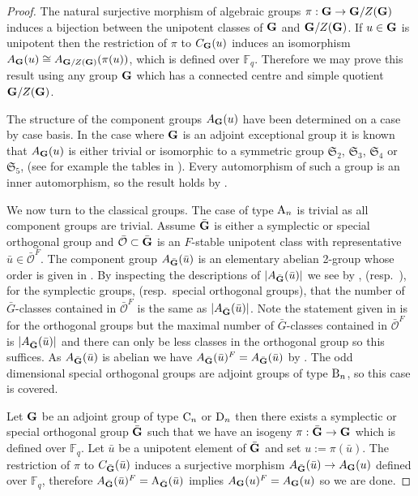 \documentclass{jt-calcs}
\renewcommand{\cref}{\Cref}
\begin{document}
\begin{proof}
The natural surjective morphism of algebraic groups $\pi : \mathbf{G} \to \mathbf{G}/Z(\mathbf{G})$ induces a bijection between the unipotent classes of $\mathbf{G}$ and $\mathbf{G}/Z(\mathbf{G})$. If $u \in \mathbf{G}$ is unipotent then the restriction of $\pi$ to $C_{\mathbf{G}}(u)$ induces an isomorphism $A_{\mathbf{G}}(u) \cong A_{\mathbf{G}/Z(\mathbf{G})}(\pi(u))$, which is defined over $\mathbb{F}_q$. Therefore we may prove this result using any group $\mathbf{G}$ which has a connected centre and simple quotient $\mathbf{G}/Z(\mathbf{G})$.

The structure of the component groups $A_{\mathbf{G}}(u)$ have been determined on a case by case basis. In the case where $\mathbf{G}$ is an adjoint exceptional group it is known that $A_{\mathbf{G}}(u)$ is either trivial or isomorphic to a symmetric group $\mathfrak{S}_2$, $\mathfrak{S}_3$, $\mathfrak{S}_4$ or $\mathfrak{S}_5$, (see for example the tables in \cite[\S 13.1]{carter:1993:finite-groups-of-lie-type}). Every automorphism of such a group is an inner automorphism, so the result holds by \cref{lem:inner-auto-comp-grp}.

We now turn to the classical groups. The case of type $\operatorname{A}_n$ is trivial as all component groups are trivial. Assume $\bar{\mathbf{G}}$ is either a symplectic or special orthogonal group and $\bar{\mathcal{O}} \subset \bar{\mathbf{G}}$ is an $F$-stable unipotent class with representative $\bar{u} \in \bar{\mathcal{O}}^F$. The component group $A_{\bar{\mathbf{G}}}(\bar{u})$ is an elementary abelian 2-group whose order is given in \cite[IV - 2.26 and 2.27]{springer-steinberg:1970:conjugacy-classes}. By inspecting the descriptions of $|A_{\bar{\mathbf{G}}}(\bar{u})|$ we see by \cite[p.\ 38]{wall:1963:conjugacy-classes-classical-groups}, (resp.\ \cite[p.\ 42]{wall:1963:conjugacy-classes-classical-groups}), for the symplectic groups, (resp.\ special orthogonal groups), that the number of $\bar{G}$-classes contained in $\bar{\mathcal{O}}^F$ is the same as $|A_{\bar{\mathbf{G}}}(\bar{u})|$. Note the statement given in \cite{wall:1963:conjugacy-classes-classical-groups} is for the orthogonal groups but the maximal number of $\bar{G}$-classes contained in $\bar{\mathcal{O}}^F$ is $|A_{\bar{\mathbf{G}}}(\bar{u})|$ and there can only be less classes in the orthogonal group so this suffices. As $A_{\bar{\mathbf{G}}}(\bar{u})$ is abelian we have $A_{\bar{\mathbf{G}}}(\bar{u})^F = A_{\bar{\mathbf{G}}}(\bar{u})$ by \cref{lem:abelian-comp-group}. The odd dimensional special orthogonal groups are adjoint groups of type $\operatorname{B}_n$, so this case is covered.

Let $\mathbf{G}$ be an adjoint group of type $\operatorname{C}_n$ or $\operatorname{D}_n$ then there exists a symplectic or special orthogonal group $\bar{\mathbf{G}}$ such that we have an isogeny $\pi : \bar{\mathbf{G}} \to \mathbf{G}$ which is defined over $\mathbb{F}_q$. Let $\bar{u}$ be a unipotent element of $\bar{\mathbf{G}}$ and set $u:=\pi(\bar{u})$. The restriction of $\pi$ to $C_{\bar{\mathbf{G}}}(\bar{u})$ induces a surjective morphism $A_{\bar{\mathbf{G}}}(\bar{u}) \to A_{\mathbf{G}}(u)$ defined over $\mathbb{F}_q$, therefore $A_{\bar{\mathbf{G}}}(\bar{u})^F = \operatorname{A}_{\bar{\mathbf{G}}}(\bar{u})$ implies $A_{\mathbf{G}}(u)^F = A_{\mathbf{G}}(u)$ so we are done.
\end{proof}
\end{document}
